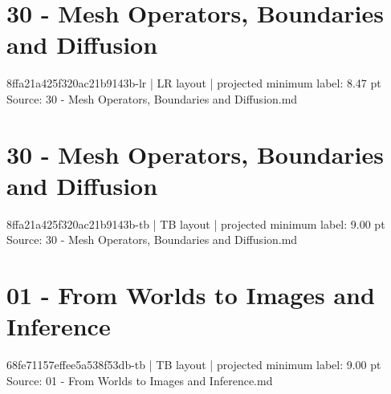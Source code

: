 \documentclass[10pt,twoside,openany]{book}
\begin{document}
\section*{30 - Mesh Operators, Boundaries and Diffusion}
\small 8ffa21a425f320ac21b9143b-lr | LR layout | projected minimum label: 8.47 pt\\
\small Source: 30 - Mesh Operators, Boundaries and Diffusion.md
\vspace{1em}
\begin{center}
\end{center}
\clearpage
\section*{30 - Mesh Operators, Boundaries and Diffusion}
\small 8ffa21a425f320ac21b9143b-tb | TB layout | projected minimum label: 9.00 pt\\
\small Source: 30 - Mesh Operators, Boundaries and Diffusion.md
\vspace{1em}
\begin{center}
\end{center}
\clearpage
\section*{01 - From Worlds to Images and Inference}
\small 68fe71157effee5a538f53db-tb | TB layout | projected minimum label: 9.00 pt\\
\small Source: 01 - From Worlds to Images and Inference.md
\vspace{1em}
\begin{center}
\end{center}
\clearpage
\end{document}
